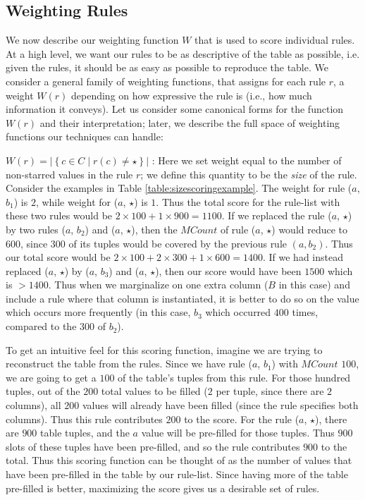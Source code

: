\subsection{Weighting Rules}
\label{sec:weighting}
We now describe our weighting function $W$ that is used to score individual rules. 
At a high level, we want our rules to be as descriptive of the table as possible, i.e. given the rules, it should be as easy as possible to reproduce the table. We consider a general family of weighting functions, that assigns for each rule $r$, a weight $W(r)$ depending on how expressive the rule is (i.e., how much information
it conveys). Let us consider some canonical forms for the function $W(r)$ and their interpretation; later, we describe the full
space of weighting functions our techniques can handle:

$W(r) = |\left\lbrace c \in C \mid r(c) \neq \star \right\rbrace |$ : 
Here we set weight equal to the number of non-starred values in the rule $r$; we define this quantity to be the {\em size} of the rule. Consider the examples in Table \ref{table:sizescoringexample}. The weight for rule ($a$, $b_1$) is $2$, while weight for ($a$, $\star$) is $1$. Thus the total score for the rule-list with these two rules would be $2 \times 100 + 1 \times 900 = 1100$. If we replaced the rule ($a$, $\star$) by two rules ($a$, $b_2$) and ($a$, $\star$), then the $MCount$ of rule ($a$, $\star$) would reduce to $600$, since $300$ of its tuples would be covered by the previous rule $(a, b_2)$. Thus our total score would be $2 \times 100 + 2 \times 300 + 1 \times 600 = 1400$. If we had instead replaced ($a$, $\star$) by ($a$, $b_3$) and ($a$, $\star$), then our score would have been $1500$ which is $> 1400$. Thus when we marginalize on one extra column ($B$ in this case) and include a rule where that column is instantiated, it is better to do so on the value which occurs more frequently (in this case, $b_3$ which occurred $400$ times, compared to the $300$ of $b_2$). 

To get an intuitive feel for this scoring function, imagine we are trying to reconstruct the table from the rules. Since we have rule ($a$, $b_1$) with $MCount$ $100$, we are going to get a $100$ of the table's tuples from this rule. For those hundred tuples, out of the $200$ total values to be filled ($2$ per tuple, since there are $2$ columns), all $200$ values will already have been filled (since the rule specifies both columns). Thus this rule contributes $200$ to the score. For the rule ($a$, $\star$), there are $900$ table tuples, and the $a$ value will be pre-filled for those tuples. Thus $900$ slots of these tuples have been pre-filled, and so the rule contributes $900$ to the total. Thus this scoring function can be thought of as the number of values that have been pre-filled in the table by our rule-list. Since having more of the table pre-filled is better, maximizing the score gives us a desirable set of rules.

